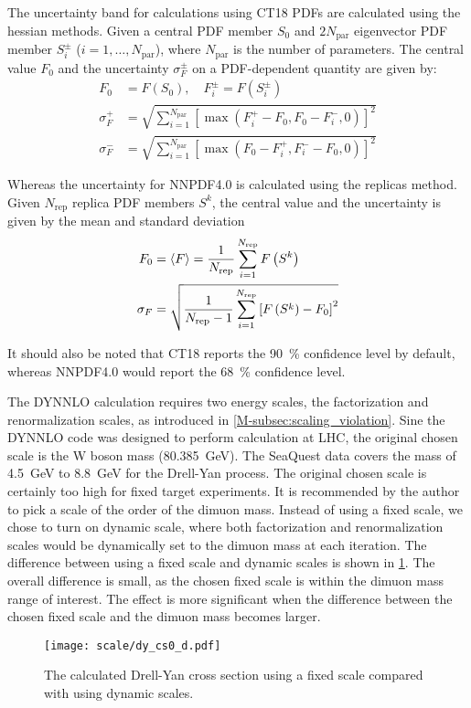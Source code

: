 \documentclass[../main.tex]{subfiles}
\begin{document}
The uncertainty band for calculations using CT18 PDFs are calculated using the hessian methods.
Given a central PDF member $S_0$ and $2N_{\mathrm{par}}$ eigenvector PDF member $S^\pm_i$ ($i=1,\dots,N_{\mathrm{par}}$),
where $N_{\mathrm{par}}$ is the number of parameters. The central value $F_0$ and the uncertainty $\sigma^\pm_F$
on a PDF-dependent quantity are given by:
\begin{equation}
	\begin{split}
		F_0 &= F(S_0),\quad F_i^\pm=F(S_i^\pm) \\
		\sigma^+_F &= \sqrt{\sum_{i=1}^{N_{\mathrm{par}}} \left[\max\left(F_i^+ - F_0, F_0 - F^-_i,0\right)\right]^2 }\\
		\sigma^-_F &= \sqrt{\sum_{i=1}^{N_{\mathrm{par}}} \left[\max\left(F_0 - F^+_i, F_i^- - F_0,0\right)\right]^2 }
	\end{split}
\end{equation}

Whereas the uncertainty for NNPDF4.0 is calculated using the replicas method. Given $N_{\mathrm{rep}}$ replica
PDF members $S^k$, the central value and the uncertainty is given by the mean and standard deviation
\begin{equation}
	\begin{split}
		F_0&=\expval{F}=\frac{1}{N_{\mathrm{rep}}}\sum_{i=1}^{N_{\mathrm{rep}}}F\left(S^k\right)\\
		\sigma_F&= \sqrt{\frac{1}{N_{\mathrm{rep}}-1}\sum_{i=1}^{N_{\mathrm{rep}}}\left[F\left(S^k\right)-F_0\right]^2}
	\end{split}
\end{equation}

It should also be noted that CT18 reports the \SI{90}{\percent} confidence level by default, whereas NNPDF4.0
would report the \SI{68}{\percent} confidence level.

The DYNNLO calculation requires two energy scales, the factorization and renormalization scales,
as introduced in \cref {M-subsec:scaling_violation}. Sine the DYNNLO code was designed to perform
calculation at LHC, the original chosen scale is the W boson mass (\SI{80.385}{\GeV}). 
The SeaQuest data covers the mass of \SI{4.5}{\GeV} to \SI{8.8}{\GeV} for the Drell-Yan
process. The original chosen scale is certainly too high for fixed target experiments. 
It is recommended by the author to pick a scale of the order of the dimuon mass. 
Instead of using a fixed scale, we chose to turn on dynamic scale,
where both factorization and renormalization scales would be dynamically set to the dimuon mass at
each iteration.  The difference between using a fixed scale and dynamic scales is shown in \cref{fig:DY_scale}.
The overall difference is small, as the chosen fixed scale is within the dimuon mass range of interest.
The effect is more significant when the difference between the chosen fixed scale and the dimuon mass
becomes larger.
\begin{figure}[h!]
	\centering
	\texttt{[image: scale/dy\_cs0\_d.pdf]}
	\caption{The calculated Drell-Yan cross section using a fixed scale compared with using dynamic scales.
	}
	\label{fig:DY_scale}
\end{figure}




\ifSubfilesClassLoaded{ \printbibliography[heading=bibintoc,title={References}]}{}
\end{document}
